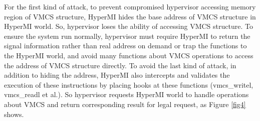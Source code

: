 \documentclass[conference]{IEEEtran}
\begin{document}
For the first kind of attack, to prevent compromised hypervisor accessing memory region of VMCS structure, HyperMI hides the base address of VMCS structure in HyperMI world. So, hypervisor loses the ability of accessing VMCS structure. To ensure the system run normally, hypervisor must require HyperMI to return the signal information rather than real address on demand or trap the functions to the HyperMI world, and avoid many functions about VMCS operations to access the address of VMCS structure directly. To avoid the last kind of attack, in addition to hiding the address, HyperMI also intercepts and validates the execution of these instructions by placing hooks at these functions (vmcs\_writel, vmcs\_readl et al.). So hypervisor requests HyperMI world to handle operations about VMCS and return corresponding result for legal request, as Figure \ref{fig4} shows.
\end{document}
